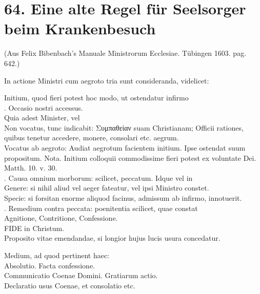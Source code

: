 \section[64. Eine alte Regel für Seelsorger]{64. Eine alte Regel für Seelsorger beim Krankenbesuch}

(Aus Felix Bibenbach’s Manuale Ministrorum Ecclesiae. Tübingen 1603. pag. 642.)

In actione Ministri cum aegroto tria sunt consideranda, videlicet:

Initium, quod fieri potest hoc modo, ut ostendatur infirmo\\
. Occasio nostri accessus.\\
\quad\quad Quia adest Minister, vel\\
\quad\quad\quad Non vocatus, tunc indicabit: Συμπαθείαν suam Christianam; Officii rationes, quibus tenetur accedere, monere, consolari etc. aegrum.\\
\quad\quad\quad Vocatus ab aegroto: Audiat aegrotum facientem initium. Ipse ostendat suum propositum. Nota. Initium colloquii commodissime fieri potest ex voluntate Dei. Matth. 10. v. 30.\\
. Causa omnium morborum: scilicet, peccatum. Idque vel in\\
\quad\quad Genere: si nihil aliud vel aeger fateatur, vel ipsi Ministro constet.\\
\quad\quad Specie: si forsitan enorme aliquod facinus, admissum ab infirmo, innotuerit.\\
. Remedium contra peccata: poenitentia scilicet, quae constat\\
\quad\quad Agnitione, Contritione, Confessione.\\
\quad\quad FIDE in Christum.\\
\quad\quad Proposito vitae emendandae, si longior hujus lucis usura concedatur.

Medium, ad quod pertinent haec:\\
\quad Absolutio. Facta confessione.\\
\quad Communicatio Coenae Domini. Gratiarum actio.\\
\quad Declaratio usus Coenae, et consolatio etc.

